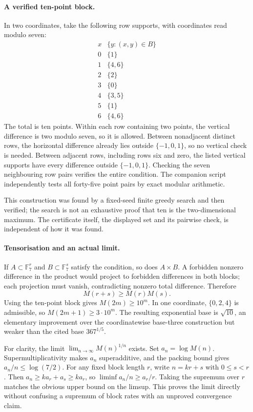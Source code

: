 \documentclass[11pt,a4paper]{article}
\newcommand{\F}{\mathbb{F}}
\begin{document}
\paragraph{A verified ten-point block.}
In two coordinates, take the following row supports, with coordinates read modulo seven:
\[
 \begin{array}{c|c}
 x&\{y:(x,y)\in B\}\\\hline
 0&\{1\}\\1&\{4,6\}\\2&\{2\}\\3&\{0\}\\
 4&\{3,5\}\\5&\{1\}\\6&\{4,6\}
 \end{array}
\]
The total is ten points. Within each row containing two points, the vertical difference is two modulo seven, so it is allowed. Between nonadjacent distinct rows, the horizontal difference already lies outside $\{-1,0,1\}$, so no vertical check is needed. Between adjacent rows, including rows six and zero, the listed vertical supports have every difference outside $\{-1,0,1\}$. Checking the seven neighbouring row pairs verifies the entire condition. The companion script independently tests all forty-five point pairs by exact modular arithmetic.

This construction was found by a fixed-seed finite greedy search and then verified; the search is not an exhaustive proof that ten is the two-dimensional maximum. The certificate itself, the displayed set and its pairwise check, is independent of how it was found.

\paragraph{Tensorisation and an actual limit.}
If $A\subset\F_7^r$ and $B\subset\F_7^s$ satisfy the condition, so does $A\times B$. A forbidden nonzero difference in the product would project to forbidden differences in both blocks; each projection must vanish, contradicting nonzero total difference. Therefore
\[
 M(r+s)\geq M(r)M(s).
\]
Using the ten-point block gives $M(2m)\geq10^m$. In one coordinate, $\{0,2,4\}$ is admissible, so $M(2m+1)\geq3\cdot10^m$. The resulting exponential base is $\sqrt{10}$, an elementary improvement over the coordinatewise base-three construction but weaker than the cited base $367^{1/5}$.

For clarity, the limit $\lim_{n\to\infty}M(n)^{1/n}$ exists. Set $a_n=\log M(n)$. Supermultiplicativity makes $a_n$ superadditive, and the packing bound gives $a_n/n\leq\log(7/2)$. For any fixed block length $r$, write $n=kr+s$ with $0\leq s<r$. Then $a_n\geq ka_r+a_s\geq ka_r$, so $\liminf a_n/n\geq a_r/r$. Taking the supremum over $r$ matches the obvious upper bound on the limsup. This proves the limit directly without confusing a supremum of block rates with an unproved convergence claim.
\end{document}
